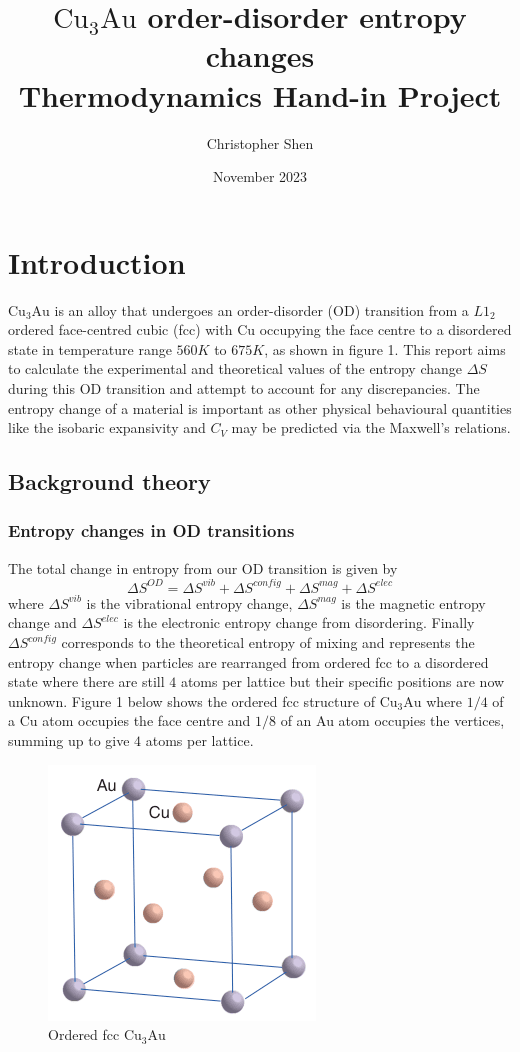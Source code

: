 \documentclass{article}
\title{
    $\text{Cu}_3\text{Au}$
    order-disorder entropy changes \\
    \large Thermodynamics Hand-in Project}
\author{Christopher Shen}
\date{November 2023}
\begin{document}
\maketitle

\tableofcontents
\newpage

\section{Introduction}

$\text{Cu}_3\text{Au}$ is an alloy that undergoes an order-disorder
(OD) transition from a $L1_2$ ordered face-centred cubic (fcc) with Cu
occupying the face centre to a disordered state in temperature range
$560K$ to $675K$\cite*{benisek}, as shown in figure 1.
This report aims to calculate the experimental and theoretical values of the
entropy change $\Delta S$ during this OD transition and attempt to
account for any discrepancies.
The entropy change of a material is important as other physical behavioural quantities
like the isobaric expansivity and $C_V$ may be predicted via the Maxwell's relations.

\subsection{Background theory}

\subsubsection{Entropy changes in OD transitions}
The total change in entropy from our OD transition is given by\cite*{paras}
$$\Delta S^{OD}=\Delta S^{vib}+\Delta S^{config}
+\Delta S^{mag}+\Delta S^{elec}$$
where $\Delta S^{vib}$ is the vibrational entropy change, 
$\Delta S^{mag}$ is the magnetic entropy change and
$\Delta S^{elec}$ is the electronic entropy change from disordering.
Finally $\Delta S^{config}$ corresponds to the theoretical entropy of mixing
and represents the entropy change when particles are rearranged 
from ordered fcc to a disordered state where there are still $4$ atoms per lattice
but their specific positions are now unknown.
Figure 1 below shows the ordered fcc structure of $\text{Cu}_3\text{Au}$
where $1/4$ of a Cu atom occupies the face centre
and $1/8$ of an Au atom occupies the vertices,
summing up to give $4$ atoms per lattice.

\begin{figure}[!htb]
    \centering
    \includegraphics[scale=0.25]{f0.png}
    \caption{Ordered fcc $\text{Cu}_3\text{Au}$\cite*{inorg}}
\end{figure}
\end{document}
